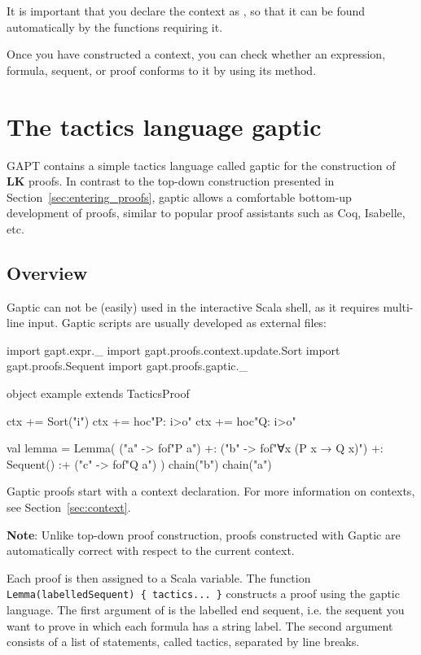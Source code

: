 \documentclass[a4paper,11pt]{book}
\newcommand{\LK}{\textbf{LK}}
\newcommand{\cli}[1]{{\ttfamily {#1}}}
\begin{document}
It is important that you declare the context as \cli{implicit}, so that it can be found automatically
by the functions requiring it.

Once you have constructed a context, you can check whether an expression, formula, sequent, or proof conforms to it by using its \cli{check} method.

\section{The tactics language gaptic}\label{sec:gaptic}

GAPT contains a simple tactics language called gaptic for the construction of {\LK} proofs.
In contrast to the top-down construction presented in Section~\ref{sec:entering_proofs},
gaptic allows a comfortable bottom-up development of proofs, similar
to popular proof assistants such as Coq, Isabelle, etc.

\subsection{Overview}

Gaptic can not be (easily) used in the interactive Scala shell, as it requires
multi-line input.  Gaptic scripts are usually developed as external files:
\begin{tacticslisting}
  import gapt.expr._
  import gapt.proofs.context.update.Sort
  import gapt.proofs.Sequent
  import gapt.proofs.gaptic._

  object example extends TacticsProof {
      ctx += Sort("i")
      ctx += hoc"P: i>o"
      ctx += hoc"Q: i>o"

      val lemma = Lemma(
      ("a" -> fof"P a") +:
      ("b" -> fof"∀x (P x → Q x)") +:
      Sequent()
      :+ ("c" -> fof"Q a")
      ) {
          chain("b")
          chain("a")
        }
    }
\end{tacticslisting}
\begin{tacticsoutput}
\end{tacticsoutput}

Gaptic proofs start with a context declaration. For more information on
contexts, see Section~\ref{sec:context}.

\textbf{Note}: Unlike top-down proof construction, proofs constructed with Gaptic
are automatically correct with respect to the current context.

Each proof is then assigned to a Scala variable.  The function
\verb,Lemma(labelledSequent) { tactics... }, constructs a proof using the
gaptic language.  The first argument of \cli{Lemma} is the labelled end
sequent, i.e. the sequent you want to prove in which each formula has a string
label.  The second argument consists of a list of statements, called tactics,
separated by line breaks.
\end{document}
